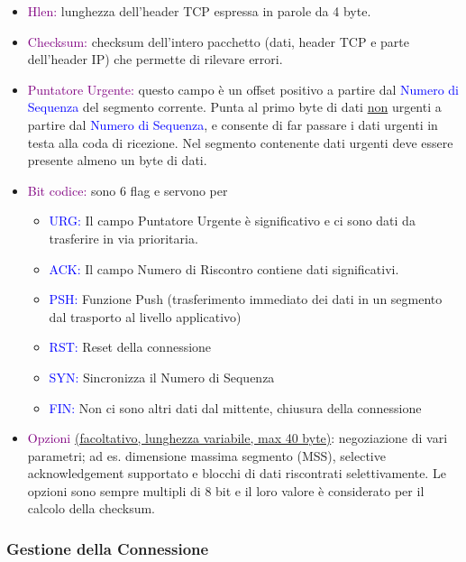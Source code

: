 \begin{itemize}
    \item \textcolor{purple}{Hlen:} lunghezza dell'header TCP espressa in parole da 4 byte.
    \item \textcolor{purple}{Checksum:} checksum dell'intero pacchetto (dati, header TCP e parte dell'header IP) che permette di rilevare errori.
    \item \textcolor{purple}{Puntatore Urgente:} questo campo è un offset positivo a partire dal \textcolor{blue}{Numero di Sequenza} del segmento corrente. 
    Punta al primo byte di dati \underline{non} urgenti a partire dal \textcolor{blue}{Numero di Sequenza}, e consente di far passare i dati urgenti in testa alla coda di ricezione. 
    Nel segmento contenente dati urgenti deve essere presente almeno un byte di dati.
    \item \textcolor{purple}{Bit codice:} sono 6 flag e servono per
        \begin{itemize}
            \item \textcolor{blue}{URG:} Il campo Puntatore Urgente è significativo e ci sono dati da trasferire in via prioritaria.
            \item \textcolor{blue}{ACK:} Il campo Numero di Riscontro contiene dati significativi.
            \item \textcolor{blue}{PSH:} Funzione Push (trasferimento immediato dei dati in un segmento dal trasporto al livello applicativo)
            \item \textcolor{blue}{RST:} Reset della connessione
            \item \textcolor{blue}{SYN:} Sincronizza il Numero di Sequenza
            \item \textcolor{blue}{FIN:} Non ci sono altri dati dal mittente, chiusura della connessione
        \end{itemize}
    \item \textcolor{purple}{Opzioni} \underline{(facoltativo, lunghezza variabile, max 40 byte)}: negoziazione di vari parametri; ad es. dimensione massima segmento (MSS), selective acknowledgement supportato e blocchi di dati riscontrati selettivamente. Le opzioni sono sempre multipli di 8 bit e il loro valore è considerato per il calcolo della checksum.
\end{itemize}

\subsubsection{Gestione della Connessione}
